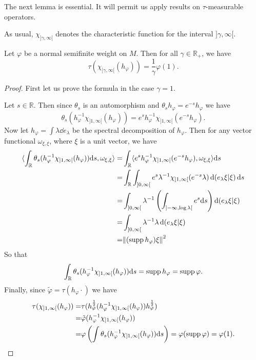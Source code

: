 The next lemma is essential. It will permit us apply results on $\tau$-measurable operators.\par
As usual, $\chi_{]\gamma,\infty[}$ denotes the characteristic function for the interval $]\gamma,\infty[$.
\begin{lemma}\label{Chap2: Lemma: 5}
    Let $\varphi$ be a normal semifinite weight on $M$. Then for all $\gamma\in \mathbb{R}_+$, we have
    \[
        \tau(\chi_{]\gamma,\infty[}(h_\varphi))=\frac{1}{\gamma}\varphi(1).
    \]
\end{lemma}
\begin{proof}
    First let us prove the formula in the case $\gamma=1$.\par
    Let $s\in \mathbb{R}$. Then since $\theta_s$ is an automorphism and $\theta_sh_\varphi=e^{-s}h_\varphi$ we have
    \[
        \theta_s(h_\varphi^{-1}\chi_{]1,\infty[}(h_\varphi))=e^sh_\varphi^{-1}\chi_{]1,\infty[}(e^{-s}h_\varphi).
    \]
    Now let $h_\varphi=\int\lambda\dd e_\lambda$ be the spectral decomposition of $h_\varphi$. Then for any vector functional $\omega_{\xi,\xi}$, where $\xi$ is a unit vector, we have
    \[
        \begin{split}
            \langle\int_\mathbb{R}\theta_s(h_\varphi^{-1}\chi_{]1,\infty[}(h_\varphi))\dd s,\omega_{\xi,\xi}\rangle=&\int_\mathbb{R}\langle e^sh_\varphi^{-1}\chi_{]1,\infty[}(e^{-s}h_\varphi),\omega_{\xi,\xi}\rangle\dd s\\
            =&\int_\mathbb{R}\int_{]0,\infty[}e^s\lambda^{-1}\chi_{]1,\infty[}(e^{-s}\lambda)\dd (e_\lambda \xi|\xi)\dd s\\
            =&\int_{]0,\infty[}\lambda^{-1}\left( \int_{]-\infty,\log \lambda[}e^s\dd s \right)\dd (e_\lambda \xi|\xi)\\
            =&\int_{]0,\infty[}\lambda^{-1}\lambda\dd (e_\lambda \xi|\xi)\\
            =&\norm{(\operatorname{supp} h_\varphi)\xi}^2
        \end{split}
    \]
    So that
    \[
        \int_\mathbb{R}\theta_s(h_\varphi^{-1}\chi_{]1,\infty[}(h_\varphi))\dd s=\operatorname{supp} h_\varphi=\operatorname{supp} \varphi.
    \]
    Finally, since $\tilde{\varphi}=\tau(h_\varphi\cdot)$ we have
    \[
        \begin{split}
            \tau(\chi_{]1,\infty[}(h_\varphi))=&\tau(h_\varphi^\frac{1}{2}(h_\varphi^{-1}\chi_{]1,\infty[}(h_\varphi))h_\varphi^\frac{1}{2})\\
            =&\tilde{\varphi}(h_\varphi^{-1}\chi_{]1,\infty[}(h_\varphi))\\
            =&\varphi\left( \int \theta_s(h_\varphi^{-1}\chi_{]1,\infty[}(h_\varphi))\dd s \right)=\varphi(\supp \varphi)=\varphi(1).

\end{split}\]
\end{proof}
